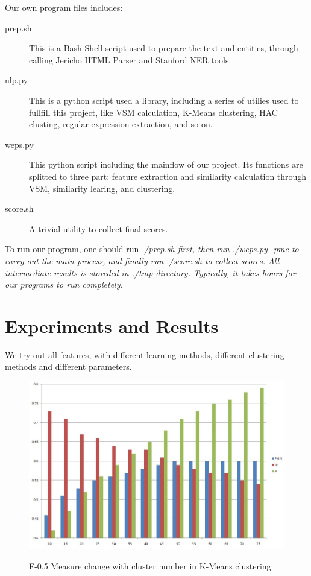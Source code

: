 \documentclass{article}
\begin{document}
\begin{CJK}{UTF8}{gbsn}
    Our own program files includes:
    \begin{description}
    \item [prep.sh] This is a  Bash Shell script used to prepare the text and entities, through calling Jericho HTML Parser and Stanford NER tools.
    \item [nlp.py] This is a python script used a library, including a series of utilies used to fullfill this project, like VSM calculation, K-Means clustering, HAC clusting, regular expression extraction, and so on.
    \item [weps.py] This python script including the mainflow of our project. Its functions are splitted to three part: feature extraction and similarity calculation through VSM, similarity learing, and clustering.
    \item [score.sh] A trivial utility to collect final scores.
    \end{description}

    To run our program, one should run \em{./prep.sh} first, then run \em{./weps.py -pmc} to carry out the main process, and finally run \em{./score.sh} to collect scores.
    All intermediate results is storeded in \em{./tmp} directory.
    Typically, it takes hours for our programs to run completely.

\section{Experiments and Results}
    We try out all features, with different learning methods, different clustering methods and different parameters. \\
    \begin{figure}
    \caption{F-0.5 Measure change with cluster number in K-Means clustering}
    \includegraphics[width=120mm]{kmeans}
    \label{fig:kmeans}
    \end{figure}


\end{CJK}
\end{document}
